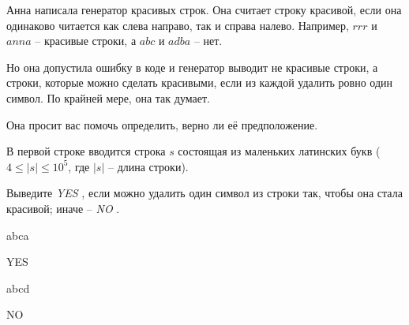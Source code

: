 
Анна написала генератор красивых строк. Она считает строку красивой,
если она одинаково читается как слева направо, так и справа налево.
Например, $rrr$ и $anna$ -- красивые строки, а $abc$ и $adba$ -- нет.

Но она допустила ошибку в коде и генератор выводит не красивые строки, а строки,
которые можно сделать красивыми, если из каждой удалить ровно один символ.
По крайней мере, она так думает.

Она просит вас помочь определить, верно ли её предположение.


В первой строке вводится строка $s$ состоящая из маленьких латинских букв
($4 \le |s| \le 10^{5}$, где $|s|$ -- длина строки).

\outputfmtSection

Выведите \textit{YES} , если можно удалить один символ из строки так,
чтобы она стала красивой; иначе -- \textit{NO} .

\exampleSection


\begin{myverbbox}[\small]{\vinput}
abca
\end{myverbbox}
\begin{myverbbox}[\small]{\voutput}
YES
\end{myverbbox}


\begin{myverbbox}[\small]{\vinput}
abcd
\end{myverbbox}
\begin{myverbbox}[\small]{\voutput}
NO
\end{myverbbox}

